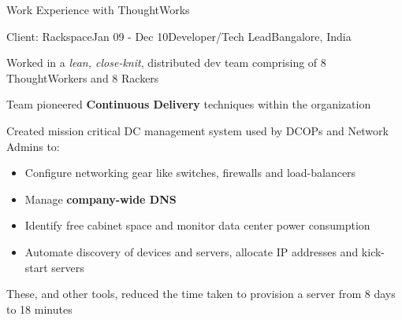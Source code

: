 \documentclass{resume} %
\begin{document}
\begin{rSection}{Work Experience with ThoughtWorks}

\begin{rSubsection}{Client: Rackspace}{Jan 09 - Dec 10}{Developer/Tech Lead}{Bangalore, India}
\item Worked in a {\em lean, close-knit}, distributed dev team comprising of 8 ThoughtWorkers and 8 Rackers
\item Team pioneered {\bf Continuous Delivery} techniques within the organization
\item Created mission critical DC management system used by
  DCOPs and Network Admins to:
\begin{itemize}  \itemsep0.5pt \parskip0pt
    \item Configure networking gear like switches, firewalls and load-balancers
    \item Manage {\bf company-wide DNS}
    \item Identify free cabinet space and monitor data center power consumption
    \item Automate discovery of devices and servers, allocate IP addresses and kick-start servers
\end{itemize}
\item These, and other tools, reduced the time taken to provision a server from 8 days to 18 minutes
\end{rSubsection}

\end{rSection}

\end{document}
